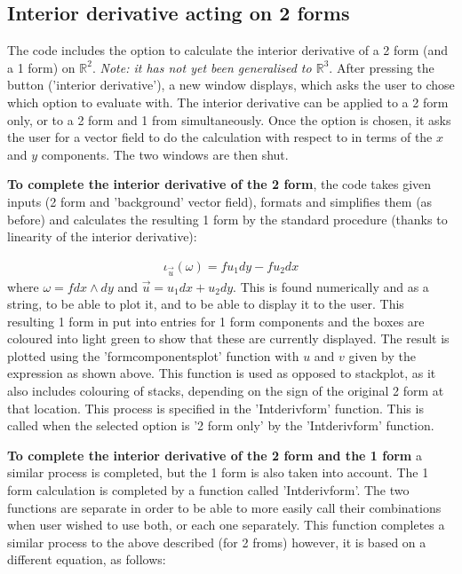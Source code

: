 \documentclass[11]{report}
\begin{document}
\subsection{Interior derivative acting on 2 forms}
The code includes the option to calculate the interior derivative of a 2 form (and a 1 form) on $\mathbb{R}^{2}$. \textit{Note: it has not yet been generalised to $\mathbb{R}^{3}$}. After pressing the button ('interior derivative'), a new window displays, which asks the user to chose which option to evaluate with. The interior derivative can be applied to a 2 form only, or to a 2 form and 1 from simultaneously. Once the option is chosen, it asks the user for a vector field to do the calculation with respect to in terms of the $x$ and $y$ components. The two windows are then shut.

\noindent \textbf{To complete the interior derivative of the 2 form}, the code takes given inputs (2 form and 'background' vector field), formats and simplifies them (as before) and calculates the resulting 1 form by the standard procedure (thanks to linearity of the interior derivative):

\begin{equation}
	\label{T2} \begin{split}
		\iota_{\vec{u}}(\omega) = f u_{1} dy - f u_{2} dx
	\end{split}
\end{equation}
where $\omega = f dx\wedge dy$ and $\vec{u} = u_{1}dx + u_{2}dy$.
This is found numerically and as a string, to be able to plot it, and to be able to display it to the user.
This resulting 1 form in put into entries for 1 form components and the boxes are coloured into light green to show that these are currently displayed. The result is plotted using the 'form\textunderscore components\textunderscore plot' function with $u$ and $v$ given by the expression as shown above. This function is used as opposed to stack\textunderscore plot, as it also includes colouring of stacks, depending on the sign of the original 2 form at that location.
This process is specified in the 'Int\textunderscore deriv\textunderscore form' function. This is called when the selected option is '2 form only' by the 'Int\textunderscore deriv\textunderscore form' function.

\noindent \textbf{To complete the interior derivative of the 2 form and the 1 form} a similar process is completed, but the 1 form is also taken into account. The 1 form calculation is completed by a function called 'Int\textunderscore deriv\textunderscore form'. The two functions are separate in order to be able to more easily call their combinations when user wished to use both, or each one separately. This function completes a similar process to the above described (for 2 froms) however, it is based on a different equation, as follows:
\end{document}
